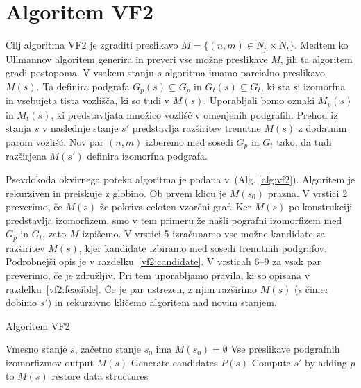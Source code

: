 \documentclass[a4paper, 12pt, ]{book}
\newcommand{\refalg}[1]{(Alg. \ref{#1})}
\begin{document}
\chapter{Algoritem VF2}

	Cilj algoritma VF2 je zgraditi preslikavo $M = \{(n,m) \in N_p \times N_t\}$. Medtem ko Ullmannov algoritem generira in preveri vse možne preslikave
	$M$, jih ta algoritem gradi postopoma. V vsakem stanju $s$ algoritma imamo parcialno preslikavo $M(s)$. Ta definira podgrafa $G_p(s) \subseteq G_p$ 
	in $G_t(s) \subseteq G_t$, ki sta si izomorfna in vsebujeta tista vozlišča, ki so tudi v $M(s)$. Uporabljali bomo oznaki $M_p(s)$ in $M_t(s)$,
	ki predstavljata množico vozlišč v omenjenih podgrafih.	Prehod iz stanja $s$ v naslednje stanje $s'$ predstavlja razširitev trenutne $M(s)$ z dodatnim
	parom vozlišč. Nov par $(n, m)$ izberemo med sosedi $G_p$ in $G_t$ tako, da tudi razširjena $M(s')$ definira izomorfna podgrafa.
	
	Psevdokoda okvirnega poteka algoritma je podana v~\refalg{alg:vf2}. Algoritem je rekurziven in preiskuje z globino. Ob prvem klicu je $M(s_0)$ prazna.
	V vrstici 2 preverimo,
	če $M(s)$ že pokriva celoten vzorčni graf. Ker $M(s)$ po konstrukciji predstavlja izomorfizem, smo v tem primeru že našli pografni izomorfizem med
	$G_p$ in $G_t$, zato $M$ izpišemo. V vrstici 5 izračunamo vse možne kandidate za razširitev $M(s)$, kjer kandidate izbiramo med sosedi trenutnih
	podgrafov. Podrobnejši opis je v razdelku~\ref{vf2:candidate}. V vrsticah 6--9 za vsak par preverimo, če je združljiv. Pri tem uporabljamo pravila, ki so
	opisana v razdelku~\ref{vf2:feasible}. Če je par ustrezen, z njim razširimo $M(s)$ (s čimer dobimo $s'$) in rekurzivno kličemo algoritem nad novim
	stanjem.

\begin{algorithm}
\caption{Algoritem VF2}
\label{alg:vf2}
\begin{algorithmic}[1]
	\Require Vmesno stanje $s$, začetno stanje $s_0$ ima $M(s_0) = \emptyset $
	\Ensure Vse preslikave podgrafnih izomorfizmov
			\State output $M(s)$
		\Else
			\State Generate candidates $P(s)$
					\State Compute $s'$ by adding $p$ to $M(s)$
					\State {}
				\EndIf
			\EndFor
		\EndIf
		\State restore data structures
	\EndProcedure
\end{algorithmic}
\end{algorithm}
\end{document}
